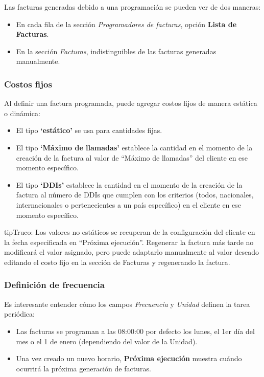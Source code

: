 \documentclass[letterpaper,10pt,spanish]{sphinxmanual}
\begin{document}
Las facturas generadas debido a una programación se pueden ver de dos maneras:
\begin{itemize}
\item {} 
En cada fila de la sección \emph{Programadores de facturas}, opción \textbf{Lista de Facturas}.

\item {} 
En la sección \emph{Facturas}, indistinguibles de las facturas generadas manualmente.

\end{itemize}


\subsubsection{Costos fijos}
\label{administration_portal/brand/invoicing/invoice_schedulers:fixed-costs}
Al definir una factura programada, puede agregar costos fijos de manera estática o dinámica:
\begin{itemize}
\item {} 
El tipo \textbf{`estático'} se usa para cantidades fijas.

\item {} 
El tipo \textbf{`Máximo de llamadas'} establece la cantidad en el momento de la creación de la factura al valor de ``Máximo de llamadas'' del cliente en ese momento específico.

\item {} 
El tipo \textbf{`DDIs'} establece la cantidad en el momento de la creación de la factura al número de DDIs que cumplen con los criterios (todos, nacionales, internacionales o pertenecientes a un país específico) en el cliente en ese momento específico.

\end{itemize}

\begin{notice}{tip}{Truco:}
Los valores no estáticos se recuperan de la configuración del cliente en la fecha especificada en ``Próxima ejecución''. Regenerar la factura más tarde no modificará el valor asignado, pero puede adaptarlo manualmente al valor deseado editando el costo fijo en la sección de Facturas y regenerando la factura.
\end{notice}


\subsubsection{Definición de frecuencia}
\label{administration_portal/brand/invoicing/invoice_schedulers:frequency-definition}
Es interesante entender cómo los campos \emph{Frecuencia} y \emph{Unidad} definen la tarea periódica:
\begin{itemize}
\item {} 
Las facturas se programan a las 08:00:00 por defecto los lunes, el 1er día del mes o el 1 de enero (dependiendo del valor de la Unidad).

\item {} 
Una vez creado un nuevo horario, \textbf{Próxima ejecución} muestra cuándo ocurrirá la próxima generación de facturas.

\end{itemize}
\end{document}
